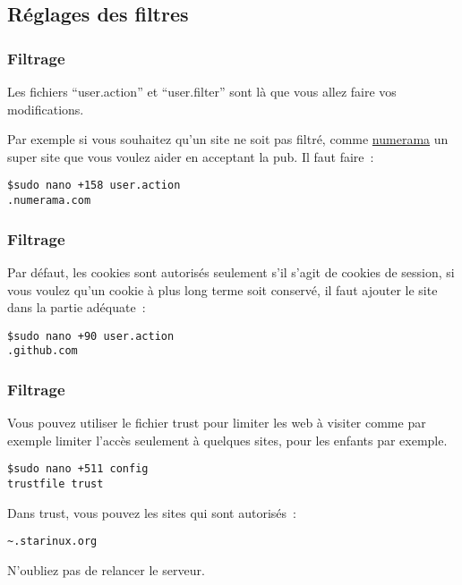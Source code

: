 \subsection{Réglages des filtres}

\begin{frame}[containsverbatim]
\frametitle{Filtrage}

Les fichiers ``user.action'' et ``user.filter'' sont là que vous allez faire vos modifications.

Par exemple si vous souhaitez qu'un site ne soit pas filtré, comme \href{numerama.com}{numerama} un super site que vous voulez aider en acceptant la pub. Il faut faire~:

\begin{verbatim}
$sudo nano +158 user.action
.numerama.com
\end{verbatim}

\end{frame}

\begin{frame}[containsverbatim]
\frametitle{Filtrage}

Par défaut, les cookies sont autorisés seulement s'il s'agit de cookies de session, si vous voulez qu'un cookie à plus long terme soit conservé, il faut ajouter le site dans la partie adéquate~:
\begin{verbatim}
$sudo nano +90 user.action
.github.com
\end{verbatim}

\end{frame}

\begin{frame}[containsverbatim]
\frametitle{Filtrage}

Vous pouvez utiliser le fichier trust pour limiter les web à visiter comme par exemple limiter l'accès seulement à quelques sites, pour les enfants par exemple.

\begin{verbatim}
$sudo nano +511 config
trustfile trust
\end{verbatim}

Dans trust, vous pouvez les sites qui sont autorisés~:
\begin{verbatim}
~.starinux.org
\end{verbatim}

N'oubliez pas de relancer le serveur.

\end{frame}